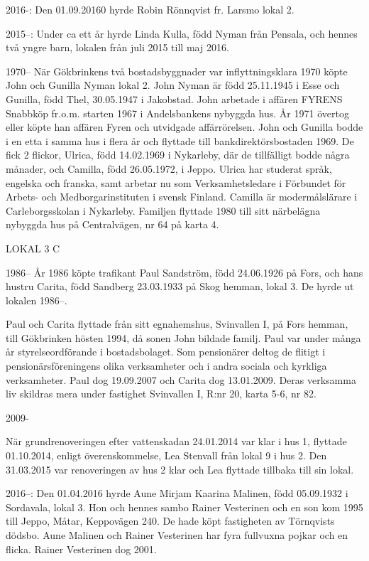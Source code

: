 2016-: Den 01.09.20160 hyrde Robin Rönnqvist fr. Larsmo lokal 2.

2015--: Under ca ett år hyrde Linda Kulla, född Nyman från Pensala, och hennes två yngre barn, lokalen från juli 2015 till maj 2016.

 1970--
När Gökbrinkens två bostadsbyggnader var inflyttningsklara 1970 köpte John och Gunilla Nyman lokal 2. John Nyman är född 25.11.1945 i Esse och Gunilla, född Thel, 30.05.1947 i Jakobstad. John arbetade i affären FYRENS Snabbköp fr.o.m. starten 1967 i Andelsbankens nybyggda hus. År 1971 övertog eller köpte han affären Fyren och utvidgade affärrörelsen. John och Gunilla bodde i en etta i samma hus i flera år och flyttade till bankdirektörsbostaden 1969. De fick 2 flickor, Ulrica, född 14.02.1969 i Nykarleby, där de tillfälligt bodde några månader, och Camilla, född 26.05.1972, i Jeppo.  Ulrica har studerat språk, engelska och franska, samt arbetar nu som Verksamhetsledare i Förbundet för Arbets- och Medborgarinstituten i svensk Finland.  Camilla är modermålslärare i Carleborgsskolan i Nykarleby. Familjen flyttade 1980 till sitt närbelägna nybyggda hus på Centralvägen, nr 64 på karta 4.


LOKAL 3 C

 1986--
År 1986 köpte trafikant Paul Sandström, född 24.06.1926 på Fors, och hans hustru Carita, född Sandberg 23.03.1933 på Skog hemman, lokal 3. De hyrde ut lokalen 1986--.

Paul och Carita flyttade från sitt egnahemshus, Svinvallen I, på Fors hemman, till Gökbrinken hösten 1994, då sonen John bildade familj. Paul var under många år styrelseordförande i bostadsbolaget. Som pensionärer deltog de flitigt i pensionärsföreningens olika verksamheter och i andra sociala och kyrkliga verksamheter. Paul dog 19.09.2007 och Carita dog 13.01.2009. Deras verksamma liv skildras mera under fastighet Svinvallen I, R:nr 20, karta 5-6, nr 82.

 2009-

När grundrenoveringen efter vattenskadan 24.01.2014 var klar i hus 1, flyttade 01.10.2014, enligt överenskommelse, Lea Stenvall från lokal 9 i hus 2. Den 31.03.2015 var renoveringen av hus 2 klar och Lea flyttade tillbaka till sin lokal.

2016--: Den 01.04.2016 hyrde Aune Mirjam Kaarina Malinen, född 05.09.1932 i Sordavala, lokal 3. Hon och hennes sambo Rainer Vesterinen och en son kom 1995 till Jeppo, Måtar, Keppovägen 240. De hade köpt fastigheten av Törnqvists dödsbo. Aune Malinen och Rainer Vesterinen har fyra fullvuxna pojkar och en flicka. Rainer Vesterinen dog 2001.

